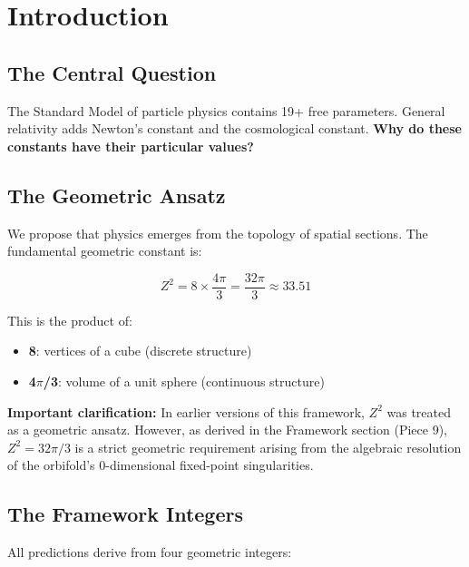 \documentclass[12pt,a4paper]{article}
\newcommand{\Zsq}{Z^2}
\begin{document}
\section{Introduction}
\label{sec:intro}

\subsection{The Central Question}

The Standard Model of particle physics contains 19+ free parameters. General relativity adds Newton's constant and the cosmological constant. \textbf{Why do these constants have their particular values?}

\subsection{The Geometric Ansatz}

We propose that physics emerges from the topology of spatial sections. The fundamental geometric constant is:

\begin{equation}
\boxed{\Zsq = 8 \times \frac{4\pi}{3} = \frac{32\pi}{3} \approx 33.51}
\end{equation}

This is the product of:
\begin{itemize}
    \item \textbf{8}: vertices of a cube (discrete structure)
    \item \textbf{4$\pi$/3}: volume of a unit sphere (continuous structure)
\end{itemize}

\textbf{Important clarification:} In earlier versions of this framework, $\Zsq$ was treated as a geometric ansatz. However, as derived in the Framework section (Piece 9), $\Zsq = 32\pi/3$ is a strict geometric requirement arising from the algebraic resolution of the orbifold's 0-dimensional fixed-point singularities.

\subsection{The Framework Integers}

All predictions derive from four geometric integers:
\end{document}
